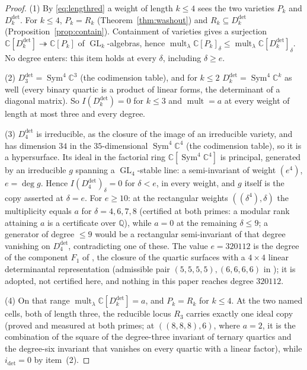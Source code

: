 \documentclass[11pt]{amsart}
\theoremstyle{plain}
\theoremstyle{definition}
\theoremstyle{remark}
\DeclareMathOperator{\GL}{GL}
\DeclareMathOperator{\Sym}{Sym}
\DeclareMathOperator{\mult}{mult}
\newcommand{\bC}{\mathbb{C}}
\newcommand{\bQ}{\mathbb{Q}}
\newcommand{\Rr}{R}
\newcommand{\Pp}{P}
\newcommand{\Ddet}{D^{\det}}
\begin{document}
\begin{proof}
(1) By \eqref{eq:lengthred} a weight of length $k\le4$ sees the two varieties
$\Pp_k$ and $\Ddet_k$.  For $k\le4$, $\Pp_k=\Rr_k$ (Theorem~\ref{thm:washout})
and $\Rr_k\subseteq\Ddet_k$ (Proposition~\ref{prop:contain}).  Containment of
varieties gives a surjection $\bC[\Ddet_k]\twoheadrightarrow\bC[\Pp_k]$ of
$\GL_k$-algebras, hence $\mult_\lambda\bC[\Pp_k]_\delta\le
\mult_\lambda\bC[\Ddet_k]_\delta$.  No degree enters: this item holds at every
$\delta$, including $\delta\ge e$.

(2) $\Ddet_3=\Sym^{4}\bC^{3}$ (the codimension table), and for $k\le2$
$\Ddet_k=\Sym^{4}\bC^{k}$ as well (every binary quartic is a product of linear
forms, the determinant of a diagonal matrix).  So $I(\Ddet_k)=0$ for $k\le3$
and $\mult=a$ at every weight of length at most three and every degree.

(3) $\Ddet_4$ is irreducible, as the closure of the image of an irreducible
variety, and has dimension $34$ in the $35$-dimensional $\Sym^{4}\bC^{4}$ (the
codimension table), so it is a hypersurface.  Its ideal in the factorial ring
$\bC[\Sym^{4}\bC^{4}]$ is principal, generated by an irreducible $g$ spanning a
$\GL_4$-stable line: a semi-invariant of weight $(e^{4})$, $e=\deg g$.  Hence
$I(\Ddet_4)_\delta=0$ for $\delta<e$, in every weight, and $g$ itself is the
copy asserted at $\delta=e$.  For $e\ge10$: at the rectangular weights
$((\delta^{4}),\delta)$ the multiplicity equals $a$ for $\delta=4,6,7,8$
(certified at both primes: a modular rank attaining $a$ is a certificate over
$\bQ$), while $a=0$ at the remaining $\delta\le9$; a generator of degree
$\le9$ would be a rectangular semi-invariant of that degree vanishing on
$\Ddet_4$, contradicting one of these.  The value $e=320112$ is the degree of
the component $F_1$ of \cite[Thm.~2]{LLV}, the closure of the quartic surfaces
with a $4\times4$ linear determinantal representation (admissible pair
$(5,5,5,5),(6,6,6,6)$ in \cite[Table~2]{LLV}); it is adopted, not certified
here, and nothing in this paper reaches degree $320112$.

(4) On that range $\mult_\lambda\bC[\Ddet_k]=a$, and $\Pp_k=\Rr_k$ for
$k\le4$.  At the two named cells, both of length three, the reducible locus
$\Rr_3$ carries exactly one ideal copy (proved and measured at both primes; at
$((8,8,8),6)$, where $a=2$, it is the combination of the square of the
degree-three invariant of ternary quartics and the degree-six invariant that
vanishes on every quartic with a linear factor), while
$i_{\det}=0$ by item~(2).
\end{proof}
\end{document}
